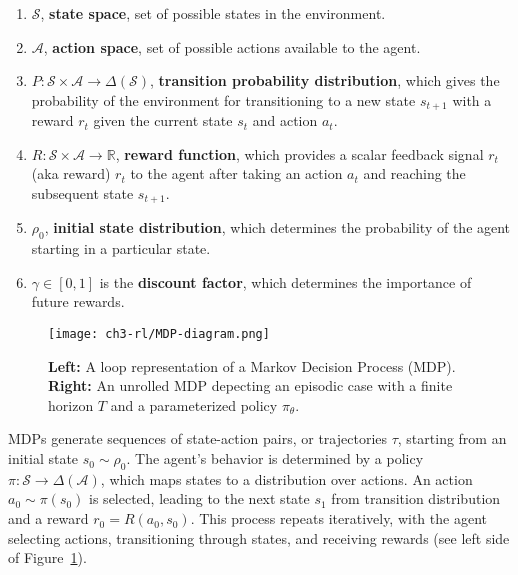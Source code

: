 \begin{enumerate}
    \item $\mathcal{S}$, \textbf{state space}, set of possible states in the environment.
    \item $\mathcal{A}$, \textbf{action space}, set of possible actions available to the agent.
    \item $P: \mathcal{S}\times\mathcal{A}\rightarrow\Delta(\mathcal{S})$, \textbf{transition probability distribution}, which gives the probability
    of the environment for transitioning to a new state $s_{t+1}$ with a reward $r_t$ given the current state $s_{t}$ and action $a_{t}$.
    \item $R: \mathcal{S}\times\mathcal{A}\rightarrow\mathbb{R}$, 
    \textbf{reward function}, which provides a scalar feedback signal $r_{t}$ (aka reward) $r_{t}$ to the agent after taking an action $a_{t}$ and reaching the subsequent state $s_{t+1}$.
    \item $\rho_{0}$, \textbf{initial state distribution}, which determines the probability of the agent starting in a particular state.
    \item $\gamma\in\left[0, 1 \right]$ is the \textbf{discount factor}, which determines the importance of future rewards.
\end{enumerate}

\begin{figure}[ht]
    \centering
    \texttt{[image: ch3-rl/MDP-diagram.png]}
    \captionsetup{width=\textwidth} %
    \caption{\textbf{Left:} A loop representation of a Markov Decision Process (MDP). \textbf{Right:} An unrolled MDP depecting an episodic case with a finite horizon $T$ and a parameterized policy $\pi_{\theta}$.}
    \label{fig:mdp-diagram}
  \end{figure}


\noindent MDPs generate sequences of state-action pairs, or trajectories $\tau$, starting from an initial state $s_{0}\sim\rho_{0}$. The agent's behavior is determined by a policy $\pi:\mathcal{S}\rightarrow\Delta(\mathcal{A})$, which maps states to a distribution over actions. An action $a_{0}\sim\pi(s_{0})$ is selected, leading to the next state $s_{1}$ from transition distribution and a reward $r_{0}=R(a_{0}, s_{0})$. This process repeats iteratively, with the agent selecting actions, transitioning through states, and receiving rewards (see left side of Figure~\ref{fig:mdp-diagram}). \\

